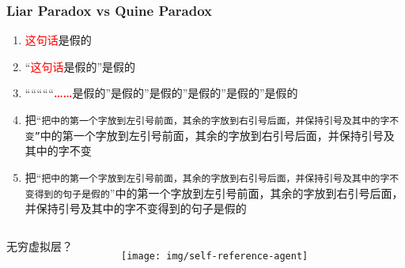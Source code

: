 \documentclass[UTF8,11pt,colorlinks,compress,openany]{beamer}%
\begin{document}
\begin{frame}\frametitle{Liar Paradox vs Quine Paradox}
\begin{enumerate}
\item \textcolor{red}{这句话}是假的
\item “\textcolor{red}{这句话}是假的”是假的
\item “““““\textcolor{red}{\textbf{……}}是假的”是假的”是假的”是假的”是假的”是假的
\item 把“\texttt{把中的第一个字放到左引号前面，其余的字放到右引号后面，并保持引号及其中的字不变”}中的第一个字放到左引号前面，其余的字放到右引号后面，并保持引号及其中的字不变
\item 把“\texttt{把中的第一个字放到左引号前面，其余的字放到右引号后面，并保持引号及其中的字不变得到的句子是假的}”中的第一个字放到左引号前面，其余的字放到右引号后面，并保持引号及其中的字不变得到的句子是假的
\end{enumerate}\vspace*{-5ex}
\begin{columns}
\begin{flushright}
\vspace*{7ex} 无穷虚拟层？
\end{flushright}
	\begin{figure}[H]\hspace*{-.6\textwidth}
		\texttt{[image: img/self-reference-agent]}
	\end{figure}
\end{columns}
\end{frame}
\end{document}
